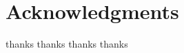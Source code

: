 \documentclass[10pt,letterpaper]{article}
\begin{document}



\section*{Acknowledgments}
thanks thanks thanks thanks

\nolinenumbers

%
%
% 


\end{document}
